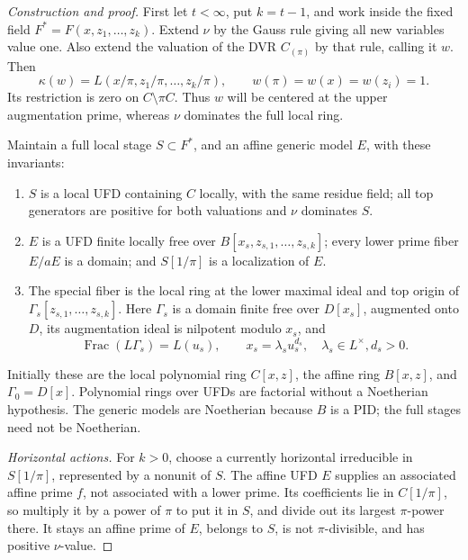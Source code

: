 \documentclass[11pt,reqno]{amsart}
\numberwithin{equation}{section}
\theoremstyle{plain}
\theoremstyle{definition}
\theoremstyle{remark}
\begin{document}
\begin{proof}[Construction and proof]
First let \(t<\infty\), put \(k=t-1\), and work inside the
fixed field \(F^*=F(x,z_1,\ldots,z_k)\).  Extend \(\nu\)
by the Gauss rule giving all new variables value one.  Also
extend the valuation of the DVR \(C_{(\pi)}\) by that rule,
calling it \(w\).  Then
\begin{equation}\label{eq:relative-gauss}
\kappa(w)=L(x/\pi,z_1/\pi,\ldots,z_k/\pi),
 \qquad w(\pi)=w(x)=w(z_i)=1.
\end{equation}
Its restriction is zero on \(C\setminus\pi C\).  Thus \(w\)
will be centered at the upper augmentation prime, whereas
\(\nu\) dominates the full local ring.

Maintain a full local stage \(S\subset F^*\), and an affine
generic model \(E\), with these invariants:
\begin{enumerate}[label=(\roman*)]
\item \(S\) is a local UFD containing \(C\) locally, with the
same residue field; all top generators are positive for both
valuations and \(\nu\) dominates \(S\).
\item \(E\) is a UFD finite locally free over
\(B[x_s,z_{s,1},\ldots,z_{s,k}]\); every lower prime fiber
\(E/aE\) is a domain; and \(S[1/\pi]\) is a localization of \(E\).
\item The special fiber is the local ring at the lower maximal
ideal and top origin of \(\Gamma_s[z_{s,1},\ldots,z_{s,k}]\).
Here \(\Gamma_s\) is a domain finite free over \(D[x_s]\),
augmented onto \(D\), its augmentation ideal is nilpotent
modulo \(x_s\), and
\[
 \operatorname{Frac}(L\Gamma_s)=L(u_s),\qquad
 x_s=\lambda_su_s^{d_s},\quad \lambda_s\in L^\times, d_s>0.
\]
\end{enumerate}
Initially these are the local polynomial ring \(C[x,z]\), the
affine ring \(B[x,z]\), and \(\Gamma_0=D[x]\).  Polynomial
rings over UFDs are factorial without a Noetherian hypothesis.
The generic models are Noetherian because \(B\) is a PID; the
full stages need not be Noetherian.

\smallskip\noindent\emph{Horizontal actions.}
For \(k>0\), choose a currently horizontal irreducible in
\(S[1/\pi]\), represented by a nonunit of \(S\).  The affine
UFD \(E\) supplies an associated affine prime \(f\), not
associated with a lower prime.  Its coefficients lie in
\(C[1/\pi]\), so multiply it by a power of \(\pi\) to put
it in \(S\), and divide out its largest \(\pi\)-power there.
It stays an affine prime of \(E\), belongs to \(S\), is not
\(\pi\)-divisible, and has positive \(\nu\)-value.


\end{proof}
\end{document}
